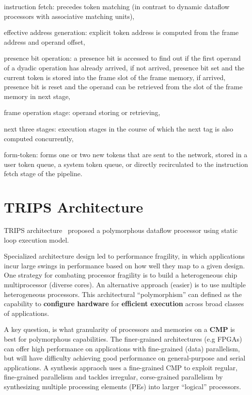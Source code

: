 \documentclass[UTF8,12pt,a4paper]{article}
\begin{document}
\begin{compactitem}
  \item instruction fetch: precedes token matching (in contrast to dynamic dataflow processors with associative matching units),
  \item effective address generation: explicit token address is computed from the frame address and operand offset,
  \item presence bit operation: a presence bit is accessed to find out if the first operand of a dyadic operation has already arrived,
        if not arrived, presence bit set and the current token is stored into the frame slot of the frame memory,
        if arrived, presence bit is reset and the operand can be retrieved from the slot of the frame memory in next stage,
  \item frame operation stage: operand storing or retrieving,
  \item next three stages: execution stages in the course of which the next tag is also computed concurrently,
  \item form-token: forms one or two new tokens that are sent to the network, stored in a user token queue,
        a system token queue, or directly recirculated to the instruction fetch stage of the pipeline.
\end{compactitem}

\clearpage

\section{TRIPS Architecture}

TRIPS architecture~\cite{DBLP:conf/isca/SankaralingamNLKHBKM03} proposed 
a polymorphous dataflow processor using static loop execution model.

Specialized architecture design led to performance fragility,
in which applications incur large swings in performance
based on how well they map to a given design.
One strategy for combating processor fragility is to build a heterogeneous chip multiprocessor (diverse cores).
An alternative approach (easier) is to use multiple heterogeneous processors.
This architectural ``polymorphism'' can defined as the capability to \textbf{configure hardware}
for \textbf{efficient execution} across broad classes of applications.

A key question, is what granularity of processors and memories
on a \textbf{CMP} is best for polymorphous capabilities.
The finer-grained architectures (e.g FPGAs) can offer high performance
on applications with fine-grained (data) parallelism,
but will have difficulty achieving good performance on general-purpose and serial applications.
A synthesis appraoch uses a fine-grained CMP to exploit regular, fine-grained parallelism
and tackles irregular, corse-grained parallelism by
synthesizing multiple processing elements (PEs) into larger ``logical'' processors.
\end{document}
